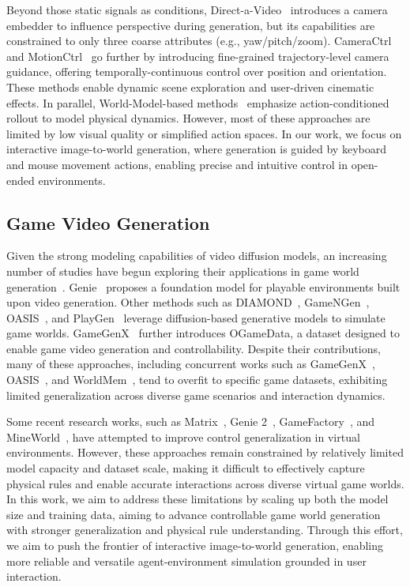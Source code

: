 \documentclass{article}
\begin{document}
Beyond those static signals as conditions, Direct-a-Video~\cite{yang2024direct} introduces a camera embedder to influence perspective during generation, but its capabilities are constrained to only three coarse attributes (e.g., yaw/pitch/zoom). CameraCtrl~\cite{he2024cameractrl} and MotionCtrl~\cite{wang2024motionctrl} go further by introducing fine-grained trajectory-level camera guidance, offering temporally-continuous control over position and orientation. These methods enable dynamic scene exploration and user-driven cinematic effects. In parallel, World-Model-based methods~\cite{hu2023gaia,xiao2025worldmem} emphasize action-conditioned rollout to model physical dynamics. However, most of these approaches are limited by low visual quality or simplified action spaces. In our work, we focus on interactive image-to-world generation, where generation is guided by keyboard and mouse movement actions, enabling precise and intuitive control in open-ended environments.

\subsection{Game Video Generation}
Given the strong modeling capabilities of video diffusion models, an increasing number of studies have begun exploring their applications in game world generation~\cite{alonso2024diffusion,che2024gamegen,bruce2024genie,oasis2024,parkerholder2024genie2,feng2024matrix,yu2025gamefactory,parkerholder2024genie2,xiao2025worldmem,valevski2024diffusion,yang2024playable,guo2025mineworld,yu2025position}. Genie~\cite{bruce2024genie} proposes a foundation model for playable environments built upon video generation. Other methods such as DIAMOND~\cite{alonso2024diffusion}, GameNGen~\cite{valevski2024diffusion}, OASIS~\cite{oasis2024}, and PlayGen~\cite{yang2024playable} leverage diffusion-based generative models to simulate game worlds.
GameGenX~\cite{che2024gamegen} further introduces OGameData, a dataset designed to enable game video generation and controllability. Despite their contributions, many of these approaches, including concurrent works such as GameGenX~\cite{che2024gamegen}, OASIS~\cite{oasis2024}, and WorldMem~\cite{xiao2025worldmem}, tend to overfit to specific game datasets, exhibiting limited generalization across diverse game scenarios and interaction dynamics.

Some recent research works, such as Matrix~\cite{feng2024matrix}, Genie 2~\cite{parkerholder2024genie2}, GameFactory~\cite{yu2025gamefactory}, and MineWorld~\cite{guo2025mineworld}, have attempted to improve control generalization in virtual environments. However, these approaches remain constrained by relatively limited model capacity and dataset scale, making it difficult to effectively capture physical rules and enable accurate interactions across diverse virtual game worlds. In this work, we aim to address these limitations by scaling up both the model size and training data, aiming to advance controllable game world generation with stronger generalization and physical rule understanding. Through this effort, we aim to push the frontier of interactive image-to-world generation, enabling more reliable and versatile agent-environment simulation grounded in user interaction.
\end{document}
